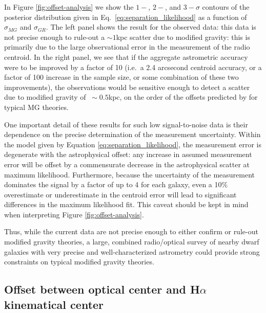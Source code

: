 \documentclass{emulateapj}
\newcommand{\ha}{H$\alpha$}
\begin{document}
In Figure \ref{fig:offset-analysis} we show the $1-$, $2-$, and $3-\sigma$
contours
of the posterior distribution given in Eq.~\ref{eq:separation_likelihood}
as a function of $\sigma_{MG}$ and $\sigma_{GR}$.  The left panel shows the
result for the observed data: this data is
not precise enough to rule-out a $\sim 1$kpc scatter due to modified
gravity: this is primarily due to the large observational error in the
measurement of the radio centroid.  In the right panel, we see that
if the aggregate astrometric accuracy were to be improved by a factor of 10
(i.e.\ a 2.4 arcsecond centroid accuracy, 
or a factor of 100 increase in the sample size, or some combination of these
two improvements),
the observations would be sensitive enough to detect a scatter due to
modified gravity of $~\sim 0.5$kpc, on the order of the offsets
predicted by \citep{bhuvjake2011} for typical MG theories.

One important detail of these results for such low signal-to-noise data
is their dependence on
the precise determination of the measurement uncertainty.  Within the model
given by Equation \ref{eq:separation_likelihood}, the measurement error is
degenerate with the astrophysical offset: any increase in assumed measurement
error will be offset by a commensurate decrease in the astrophysical scatter
at maximum likelihood.  Furthermore, because the uncertainty of the measurement
dominates the signal by a factor of up to 4 for each galaxy, even a 10\%
overestimate or underestimate in the centroid error will lead to significant
differences in the maximum likelihood fit.  This caveat should be kept in
mind when interpreting Figure \ref{fig:offset-analysis}.

Thus, while the current data are not precise enough to either confirm or
rule-out modified gravity theories, a large, combined radio/optical survey of
nearby dwarf galaxies with very precise and well-characterized astrometry
could provide strong constraints on typical modified gravity theories.


\subsection{Offset between optical center and \ha{} kinematical center}
\label{sec:kinematical}
\end{document}
